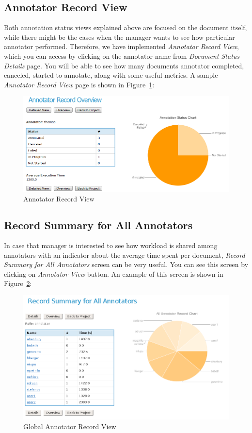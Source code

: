 \subsection{Annotator Record View}
Both annotation status views explained above are focused on the document
itself, while there might be the cases when the manager wants to see how
particular annotator performed. Therefore, we have implemented \emph{Annotator
Record View}, which you can access by clicking on the annotator name from
\emph{Document Status Details} page.
You will be able to see how many documents annotator completed, canceled,
started to annotate, along with some useful metrics. A sample \emph{Annotator
Record View} page is shown in Figure~\ref{fig:annotatorrecordview}:
\begin{figure}[ht!]
\centering
\includegraphics[scale=0.4]{annotatorrecordview}
\caption{Annotator Record View}
\label{fig:annotatorrecordview}
\end{figure}


\subsection{Record Summary for All Annotators}
In case that manager is interested to see how workload is shared among
annotators with an indicator about the average time spent per document,
\emph{Record Summary for All Annotators} screen can be very useful.
You can see this screen by clicking on \emph{Annotator View} button.
An example of this screen is shown in
Figure~\ref{fig:globalannotatorrecordview}: 
\begin{figure}[ht!]
\centering
\includegraphics[scale=0.4]{globalannotatorrecordview}
\caption{Global Annotator Record View}
\label{fig:globalannotatorrecordview}
\end{figure}

